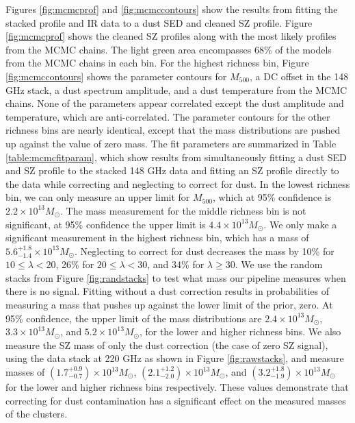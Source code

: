 \documentclass[a4paper,fleqn,usenatbib]{mnras}
\begin{document}
Figures \ref{fig:mcmcprof} and \ref{fig:mcmccontours} show the results from fitting the stacked profile and IR data to a dust SED and cleaned SZ profile. Figure \ref{fig:mcmcprof} shows the cleaned SZ profiles along with the most likely profiles from the MCMC chains. The light green area encompasses 68\% of the models from the MCMC chains in each bin.  For the highest richness bin, Figure \ref{fig:mcmccontours} shows the parameter contours for $M_{500}$, a DC offset in the 148 GHz stack, a dust spectrum amplitude, and a dust temperature from the MCMC chains. None of the parameters appear correlated except the dust amplitude and temperature, which are anti-correlated. The parameter contours for the other richness bins are nearly identical, except that the mass distributions are pushed up against the value of zero mass.
The fit parameters are summarized in Table \ref{table:mcmcfitparam}, which show results from simultaneously fitting a dust SED and SZ profile to the stacked 148 GHz data and fitting an SZ profile directly to the data while correcting and neglecting to correct for dust. In the lowest richness bin, we can only measure an upper limit for $M_{500}$, which at 95\% confidence is $2.2 \times 10^{13} M_{\odot}$. The mass measurement for the middle richness bin is not significant, at 95\% confidence the upper limit is $4.4 \times 10^{13} M_{\odot}$. We only make a significant measurement in the highest richness bin, which has a mass of $5.6^{+1.8}_{-1.4} \times 10^{13} M_{\odot}$. Neglecting to correct for dust decreases the mass by 10\% for $10 \leq \lambda < 20$, 26\% for $20 \leq \lambda < 30$, and 34\% for $\lambda \geq 30$.
We use the random stacks from Figure \ref{fig:randstacks} to test what mass our pipeline measures when there is no signal. Fitting without a dust correction results in probabilities of measuring a mass that pushes up against the lower limit of the prior, zero. At 95\% confidence, the upper limit of the mass distributions are $2.4 \times 10^{13} M_{\odot}$, $3.3 \times 10^{13} M_{\odot}$, and $5.2 \times 10^{13} M_{\odot}$, for the lower and higher richness bins.
We also measure the SZ mass of only the dust correction (the case of zero SZ signal), using the data stack at 220 GHz as shown in Figure \ref{fig:rawstacks}, and measure masses of $(1.7^{+0.9}_{-0.7}) \times 10^{13} M_{\odot}$, $(2.1^{+1.2}_{-2.0}) \times 10^{13} M_{\odot}$, and $(3.2^{+1.8}_{-1.9}) \times 10^{13} M_{\odot}$ for the lower and higher richness bins respectively. These values demonstrate that correcting for dust contamination has a significant effect on the measured masses of the clusters.
\end{document}

